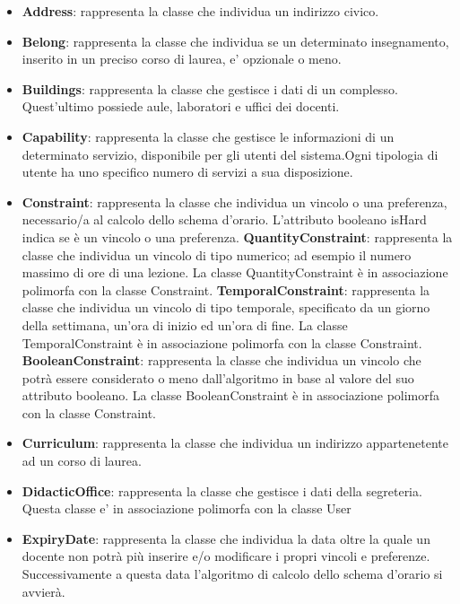 \documentclass[11pt,a4paper]{article}
\begin{document}
\begin{itemize}
\item \textbf{Address}: rappresenta la classe che individua un indirizzo civico. 

\item \textbf{Belong}: rappresenta la classe che individua se un determinato insegnamento, inserito in un preciso corso di laurea, e' opzionale o meno.

\item \textbf{Buildings}: rappresenta la classe che gestisce i dati di un complesso. Quest'ultimo possiede aule, laboratori e uffici dei docenti. 

\item \textbf{Capability}: rappresenta la classe che gestisce le informazioni di un determinato servizio, disponibile per gli utenti del sistema.Ogni tipologia di utente ha uno specifico numero di servizi a sua disposizione.

\item \textbf{Constraint}: rappresenta la classe che individua un vincolo o una preferenza, necessario/a al calcolo dello schema d'orario. L'attributo booleano isHard indica se è un vincolo o una preferenza.
\subitem \textbf{QuantityConstraint}: rappresenta la classe che individua un vincolo di tipo numerico; ad esempio il numero massimo di ore di una lezione. La classe QuantityConstraint è in associazione polimorfa con la classe Constraint.
\subitem \textbf{TemporalConstraint}: rappresenta la classe che individua un vincolo di tipo temporale, specificato da un giorno della settimana, un'ora di inizio ed un'ora di fine. La classe TemporalConstraint è in associazione polimorfa con la classe Constraint.
\subitem \textbf{BooleanConstraint}: rappresenta la classe che individua un vincolo che potrà essere considerato o meno dall'algoritmo in base al valore del suo attributo booleano. La classe BooleanConstraint è in associazione polimorfa con la classe Constraint. 

\item \textbf{Curriculum}: rappresenta la classe che individua un indirizzo appartenetente ad un corso di laurea.

\item \textbf{DidacticOffice}: rappresenta la classe che gestisce i dati della segreteria. Questa classe e' in associazione polimorfa con la classe User 

\item \textbf{ExpiryDate}: rappresenta la classe che individua la data oltre la quale un docente non potrà più inserire e/o modificare i propri vincoli e preferenze. Successivamente a questa data l'algoritmo di calcolo dello schema d'orario si avvierà. 


\end{itemize}
\end{document}
